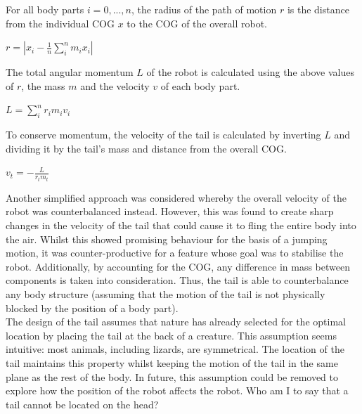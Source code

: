 \documentclass{article}
\begin{document}
For all body parts $i = 0, ..., n$, the radius of the path of motion $r$ is the distance from the individual COG $x$ to the COG of the overall robot.
\begin{center}
\begin{Large}
$r = |x_{i} - \frac{1}{n}\sum_{i}^{n}m_{i}x_{i}|$
\end{Large}
\end{center}

The total angular momentum $L$ of the robot is calculated using the above values of $r$, the mass $m$ and the velocity $v$ of each body part. 
\begin{center}
\begin{Large}
$L = \sum^{n}_{i} r_{i}m_{i}v_{i}$
\end{Large}
\end{center}

To conserve momentum, the velocity of the tail is calculated by inverting $L$ and dividing it by the tail's mass and distance from the overall COG.
\begin{center}
\begin{Large}
$v_{t} = - \frac{L}{r_{t}m_{t}}$\\
\end{Large}
\end{center}

Another simplified approach was considered whereby the overall velocity of the robot was counterbalanced instead. However, this was found to create sharp changes in the velocity of the tail that could cause it to fling the entire body into the air. Whilst this showed promising behaviour for the basis of a jumping motion, it was counter-productive for a feature whose goal was to stabilise the robot. Additionally, by accounting for the COG, any difference in mass between components is taken into consideration. Thus, the tail is able to counterbalance any body structure (assuming that the motion of the tail is not physically blocked by the position of a body part).\\

The design of the tail assumes that nature has already selected for the optimal location by placing the tail at the back of a creature. This assumption seems intuitive: most animals, including lizards, are symmetrical. The location of the tail maintains this property whilst keeping the motion of the tail in the same plane as the rest of the body. In future, this assumption could be removed to explore how the position of the robot affects the robot. Who am I to say that a tail cannot be located on the head?
\end{document}
